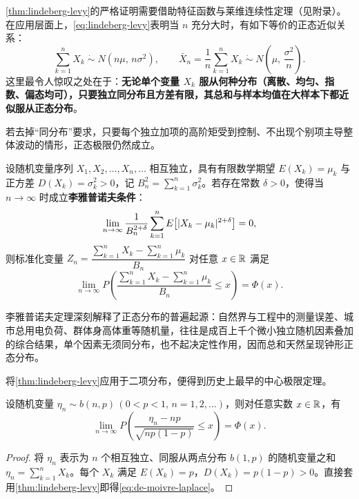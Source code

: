 \cref{thm:lindeberg-levy}的严格证明需要借助特征函数与莱维连续性定理（见附录）。在应用层面上，\eqref{eq:lindeberg-levy}表明当 $n$ 充分大时，有如下等价的正态近似关系：
\begin{equation}
  \sum_{k=1}^{n}X_k\;\dot{\sim}\;N(n\mu,\,n\sigma^2),\qquad
  \bar{X}_n=\frac{1}{n}\sum_{k=1}^{n}X_k\;\dot{\sim}\;N\!\left(\mu,\,\frac{\sigma^2}{n}\right).
  \label{eq:clt-approx}
\end{equation}
这里最令人惊叹之处在于：\textbf{无论单个变量 $X_k$ 服从何种分布（离散、均匀、指数、偏态均可），只要独立同分布且方差有限，其总和与样本均值在大样本下都近似服从正态分布}。

若去掉“同分布”要求，只要每个独立加项的高阶矩受到控制、不出现个别项主导整体波动的情形，正态极限仍然成立。

\begin{theorem}
\label{thm:lyapunov-clt}
设随机变量序列 $X_1,X_2,\ldots,X_n,\ldots$ 相互独立，具有有限数学期望 $E(X_k)=\mu_k$ 与正方差 $D(X_k)=\sigma_k^2>0$，记 $B_n^2=\sum_{k=1}^{n}\sigma_k^2$。若存在常数 $\delta>0$，使得当 $n\to\infty$ 时成立\textbf{李雅普诺夫条件}：
\begin{equation}
  \lim_{n\to\infty}\frac{1}{B_n^{2+\delta}}\sum_{k=1}^{n}E\bigl[\lvert X_k-\mu_k\rvert^{2+\delta}\bigr]=0,
  \label{eq:lyapunov-cond}
\end{equation}
则标准化变量 $Z_n=\dfrac{\sum_{k=1}^{n}X_k-\sum_{k=1}^{n}\mu_k}{B_n}$ 对任意 $x\in\mathbb{R}$ 满足
\begin{equation}
  \lim_{n\to\infty}P\!\left(\frac{\displaystyle\sum_{k=1}^{n}X_k-\sum_{k=1}^{n}\mu_k}{B_n}\le x\right)=\Phi(x).
  \label{eq:lyapunov-clt}
\end{equation}
\end{theorem}

李雅普诺夫定理深刻解释了正态分布的普遍起源：自然界与工程中的测量误差、城市总用电负荷、群体身高体重等随机量，往往是成百上千个微小独立随机因素叠加的综合结果，单个因素无须同分布，也不起决定性作用，因而总和天然呈现钟形正态分布。

将\cref{thm:lindeberg-levy}应用于二项分布，便得到历史上最早的中心极限定理。

\begin{theorem}
\label{thm:de-moivre-laplace}
设随机变量 $\eta_n\sim b(n,p)\,(0<p<1,\,n=1,2,\ldots)$，则对任意实数 $x\in\mathbb{R}$，有
\begin{equation}
  \lim_{n\to\infty}P\!\left(\frac{\eta_n-np}{\sqrt{np(1-p)}}\le x\right)=\Phi(x).
  \label{eq:de-moivre-laplace}
\end{equation}
\end{theorem}
\begin{proof}
将 $\eta_n$ 表示为 $n$ 个相互独立、同服从两点分布 $b(1,p)$ 的随机变量之和 $\eta_n=\sum_{k=1}^{n}X_k$。每个 $X_k$ 满足 $E(X_k)=p$，$D(X_k)=p(1-p)>0$。直接套用\cref{thm:lindeberg-levy}即得\eqref{eq:de-moivre-laplace}。
\end{proof}

